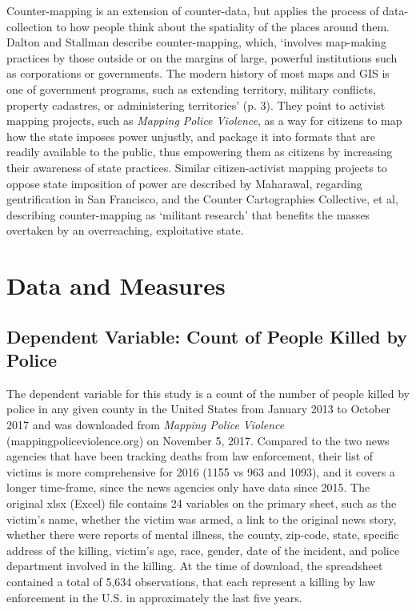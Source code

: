 \documentclass[sigconf]{acmart}
\begin{document}
Counter-mapping is an extension of counter-data, but applies the process of data-collection to how people think about the spatiality of the places around them.  Dalton and Stallman describe counter-mapping, which, `involves map-making practices by those outside or on the margins of large, powerful institutions such as corporations or governments. The modern history of most maps and GIS is one of government programs, such as extending territory, military conflicts, property cadastres, or administering territories' (p. 3). \cite{dalton17}  They point to activist mapping projects, such as {\em Mapping Police Violence}, as a way for citizens to map how the state imposes power unjustly, and package it into formats that are readily available to the public, thus empowering them as citizens by increasing their awareness of state practices. Similar citizen-activist mapping projects to oppose state imposition of power are described by Maharawal, regarding gentrification in San Francisco, and the Counter Cartographies Collective, et al, describing counter-mapping as `militant research' that benefits the masses overtaken by an overreaching, exploitative state. \cite{maharawal17,ccc12}

\section{Data and Measures}
\subsection{Dependent Variable: Count of People Killed by Police}
The dependent variable for this study is a count of the number of people killed by police in any given county in the United States from January 2013 to October 2017 and was downloaded from {\em Mapping Police Violence} (mappingpoliceviolence.org) on November 5, 2017.  Compared to the two news agencies that have been tracking deaths from law enforcement, their list of victims is more comprehensive for 2016 (1155 vs 963 and 1093), and it covers a longer time-frame, since the news agencies only have data since 2015.  The original xlsx (Excel) file contains 24 variables on the primary sheet, such as the victim's name, whether the victim was armed, a link to the original news story, whether there were reports of mental illness, the county, zip-code, state, specific address of the killing, victim's age, race, gender, date of the incident, and police department involved in the killing. At the time of download, the spreadsheet contained a total of 5,634 observations, that each represent a killing by law enforcement in the U.S. in approximately the last five years.
\end{document}
